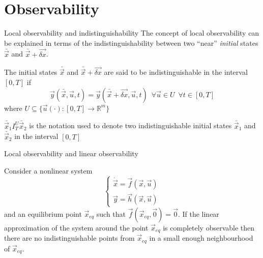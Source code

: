 \section{Observability}

\begin{frame}{Local observability and indistinguishability \theory}
  The concept of \alert{local observability} can be explained in terms of the indistinguishability
  between two ``near'' \emph{initial} states $\bar{\vec{x}}$ and $\bar{\vec{x}} + \vec{\delta x}$.
  \par
  The initial states $\bar{\vec{x}}$ and $\bar{\vec{x}} + \vec{\delta x}$ are said to be
  \alert{indistinguishable} in the interval $[0, T]$ if
  \[
  \vec{y}(\bar{\vec{x}}, \vec{u}, t) = \vec{y}(\bar{\vec{x}} + \vec{\delta x}, \vec{u}, t)\enspace
  \forall \vec{u} \in U \enspace \forall t \in [0,T]
  \]
  where $U \subseteq \{\vec{u}(\cdot):[0,T] \rightarrow \mathbb{R}^{m}\}$
  \par
  $\bar{\vec{x}}_1 I^{U}_{T} \bar{\vec{x}}_2$ is the notation used to denote two indistinguishable initial states $\bar{\vec{x}}_1$
  and $\bar{\vec{x}}_2$ in the interval $[0,T]$

\end{frame}

\begin{frame}{Local observability and linear observability \theory}
  \begin{theorem}
    Consider a nonlinear system 
    \[
    \begin{cases}
      \dot{\vec{x}} = \vec{f}(\vec{x}, \vec{u})\\
      \vec{y} = \vec{h}(\vec{x}, \vec{u})
    \end{cases}
    \]
    and an equilibrium point $\vec{x}_{eq}$ such that $\vec{f}(\vec{x}_{eq}, \vec{0}) = \vec{0}$.
    If the linear approximation of the system around the point $\vec{x}_{eq}$ is completely
    observable then there are no indistinguishable points from $\vec{x}_{eq}$ in a small enough
    neighbourhood of $\vec{x}_{eq}$.
  \end{theorem}
\end{frame}

